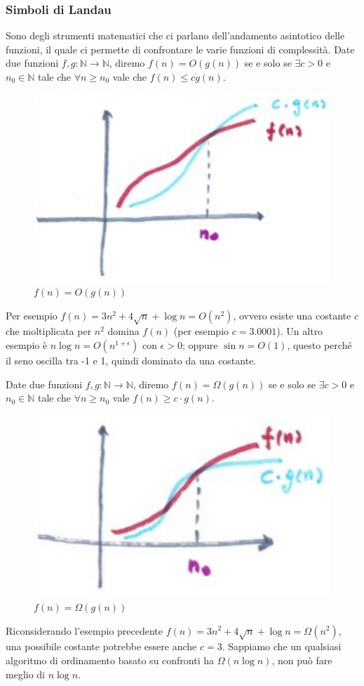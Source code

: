 \documentclass{article}
\begin{document}
\subsubsection{Simboli di Landau}
Sono degli strumenti matematici che ci parlano dell'andamento asintotico delle funzioni, il
quale ci permette di confrontare le varie funzioni di complessità. Date due funzioni $f,g:\mathbb{N}\rightarrow\mathbb{N}$,
diremo $f(n)=O(g(n))$ se e solo se $\exists c>0$ e $n_0\in\mathbb{N}$ tale che $\forall n\geq n_0$
vale che $f(n)\leq c\dot g(n)$.
\begin{figure}[H]
    \centering
    \includegraphics[scale=0.5]{images/ogrande.png}
    \caption{$f(n)=O(g(n))$}
\end{figure}
Per esempio $f(n)=3n^2+4\sqrt{n}+\log n=O(n^2)$, ovvero esiste una costante $c$ che moltiplicata
per $n^2$ domina $f(n)$ (per esempio $c=3.0001$). Un altro esempio è $n\log n=O(n^{1+\epsilon})$
con $\epsilon>0$; oppure $\sin n = O(1)$, questo perché il seno oscilla tra -1 e 1,
quindi dominato da una costante.

Date due funzioni $f,g:\mathbb{N}\rightarrow\mathbb{N}$, diremo $f(n)=\Omega(g(n))$ se e solo
se $\exists c>0$ e $n_0\in\mathbb{N}$ tale che $\forall n\geq n_0$ vale $f(n)\geq c\cdot g(n)$.
\begin{figure}[H]
    \centering
    \includegraphics[scale=0.5]{images/omegagrande.png}
    \caption{$f(n)=\Omega (g(n))$}
\end{figure}
Riconsiderando l'esempio precedente $f(n)=3n^2+4\sqrt{n}+\log n=\Omega(n^2)$, una possibile
costante potrebbe essere anche $c=3$. Sappiamo che un qualsiasi algoritmo di ordinamento
basato su confronti ha $\Omega (n\log n)$, non può fare meglio di $n\log n$.
\end{document}
